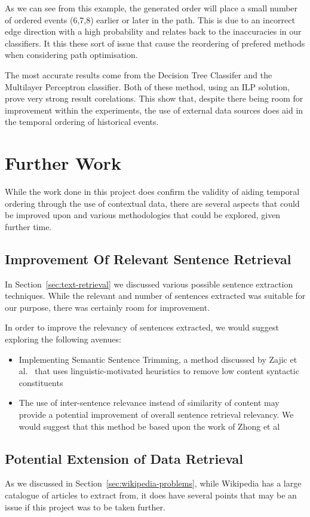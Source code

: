 \documentclass[bsc,frontabs,twoside,singlespacing,parskip,deptreport]{infthesis}     %
\begin{document}
As we can see from this example, the generated order will place a small number of ordered events (6,7,8) earlier or
later in the path. This is due to an incorrect edge direction with a high probability and relates back to the
inaccuracies in our classifiers. It this these sort of issue that cause the reordering of prefered methods when considering
path optimisation.

The most accurate results come from the Decision Tree Classifer and the Multilayer Perceptron classifier.
Both of these method, using an ILP solution, prove very strong result corelations. This show that, despite there
being room for improvement within the experiments, the use of external data sources does aid in the temporal ordering
of historical events.

\section{Further Work}
While the work done in this project does confirm the validity of aiding temporal ordering through the use of contextual
data, there are several aspects that could be improved upon and various methodologies that could be explored, given further
time.

\subsection{Improvement Of Relevant Sentence Retrieval}
In Section~\ref{sec:text-retrieval} we discussed various possible sentence extraction techniques.
While the relevant and number of sentences extracted was suitable for our purpose, there was certainly room for improvement.

In order to improve the relevancy of sentences extracted, we would suggest exploring the following avenues:
\begin{itemize}
\item Implementing Semantic Sentence Trimming, a method discussed by Zajic et al.~\cite{zajic2005sentence} that
  uses linguistic-motivated heuristics to remove low content syntactic constituents 

\item The use of inter-sentence relevance instead of similarity of content may provide a potential improvement of
  overall sentence retrieval relevancy. We would suggest that this method be based upon the work of Zhong et al~\cite{zhong2008practical}
\end{itemize}

\subsection{Potential Extension of Data Retrieval}
As we discussed in Section~\ref{sec:wikipedia-problems}, while Wikipedia has a large catalogue of articles to extract from,
it does have several points that may be an issue if this project was to be taken further.
\end{document}
